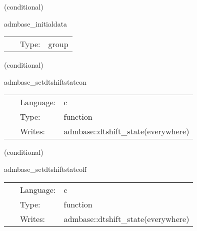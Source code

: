 \vspace{5mm}

   (conditional) 

\hspace{5mm} admbase\_initialdata 

\hspace{5mm}{\it schedule group for calculating adm initial data } 


\hspace{5mm}

 \begin{tabular*}{160mm}{cll} 
~ & Type:  & group \\ 
\end{tabular*} 


\vspace{5mm}

   (conditional) 

\hspace{5mm} admbase\_setdtshiftstateon 

\hspace{5mm}{\it set the dtshift\_state variable to 1 } 


\hspace{5mm}

 \begin{tabular*}{160mm}{cll} 
~ & Language:  & c \\ 
~ & Type:  & function \\ 
~ & Writes:  & admbase::dtshift\_state(everywhere) \\ 
\end{tabular*} 


\vspace{5mm}

   (conditional) 

\hspace{5mm} admbase\_setdtshiftstateoff 

\hspace{5mm}{\it set the dtshift\_state variable to 0 } 


\hspace{5mm}

 \begin{tabular*}{160mm}{cll} 
~ & Language:  & c \\ 
~ & Type:  & function \\ 
~ & Writes:  & admbase::dtshift\_state(everywhere) \\ 
\end{tabular*} 


